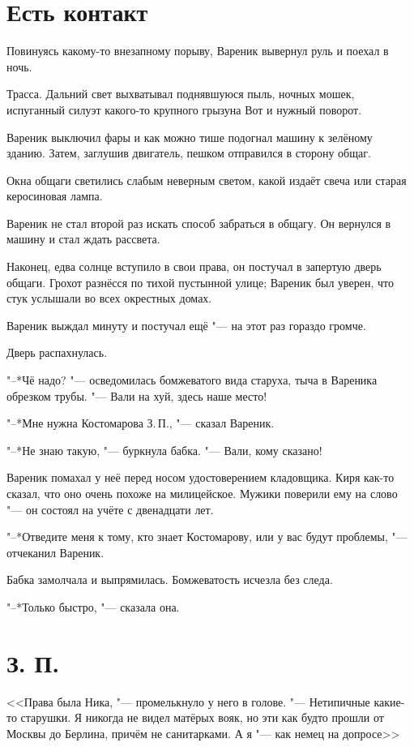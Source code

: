 \section{Есть контакт}

Повинуясь какому-то внезапному порыву, Вареник вывернул руль и поехал в ночь.

Трасса.
Дальний свет выхватывал поднявшуюся пыль, ночных мошек, испуганный силуэт какого-то крупного грызуна\ldotst
Вот и нужный поворот.

Вареник выключил фары и как можно тише подогнал машину к зелёному зданию.
Затем, заглушив двигатель, пешком отправился в сторону общаг.

Окна общаги светились слабым неверным светом, какой издаёт свеча или старая керосиновая лампа.

Вареник не стал второй раз искать способ забраться в общагу.
Он вернулся в машину и стал ждать рассвета.

Наконец, едва солнце вступило в свои права, он постучал в запертую дверь общаги.
Грохот разнёсся по тихой пустынной улице;
Вареник был уверен, что стук услышали во всех окрестных домах.

Вареник выждал минуту и постучал ещё "--- на этот раз гораздо громче.

Дверь распахнулась.

"--*Чё надо? "--- осведомилась бомжеватого вида старуха, тыча в Вареника обрезком трубы.
"--- Вали на хуй, здесь наше место!

"--*Мне нужна Костомарова З.\,П., "--- сказал Вареник.

"--*Не знаю такую, "--- буркнула бабка.
"--- Вали, кому сказано!

Вареник помахал у неё перед носом удостоверением кладовщика.
Киря как-то сказал, что оно очень похоже на милицейское.
Мужики поверили ему на слово "--- он состоял на учёте с двенадцати лет.

"--*Отведите меня к тому, кто знает Костомарову, или у вас будут проблемы, "--- отчеканил Вареник.

Бабка замолчала и выпрямилась.
Бомжеватость исчезла без следа.

"--*Только быстро, "--- сказала она.

\section{З. П.}

<<Права была Ника, "--- промелькнуло у него в голове.
"--- Нетипичные какие-то старушки.
Я никогда не видел матёрых вояк, но эти как будто прошли от Москвы до Берлина, причём не санитарками.
А я "--- как немец на допросе\ldotst>>

